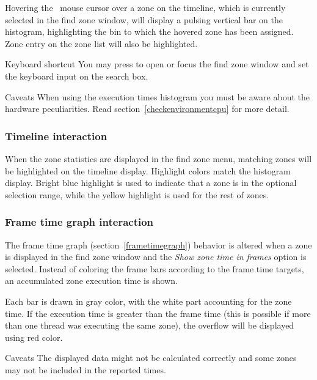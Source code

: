 \documentclass[hidelinks,titlepage,a4paper]{article}
\begin{document}
Hovering the \faMousePointer{}~mouse cursor over a zone on the timeline, which is currently selected in the find zone window, will display a pulsing vertical bar on the histogram, highlighting the bin to which the hovered zone has been assigned. Zone entry on the zone list will also be highlighted.

\begin{bclogo}[
noborder=true,
couleur=black!5,
logo=\bclampe
]{Keyboard shortcut}
You may press  to open or focus the find zone window and set the keyboard input on the search box.
\end{bclogo}

\begin{bclogo}[
noborder=true,
couleur=black!5,
logo=\bcattention
]{Caveats}
When using the execution times histogram you must be aware about the hardware peculiarities. Read section~\ref{checkenvironmentcpu} for more detail.
\end{bclogo}

\subsubsection{Timeline interaction}

When the zone statistics are displayed in the find zone menu, matching zones will be highlighted on the timeline display. Highlight colors match the histogram display. Bright blue highlight is used to indicate that a zone is in the optional selection range, while the yellow highlight is used for the rest of zones.

\subsubsection{Frame time graph interaction}
\label{frametimefindzone}

The frame time graph (section~\ref{frametimegraph}) behavior is altered when a zone is displayed in the find zone window and the \emph{Show zone time in frames} option is selected. Instead of coloring the frame bars according to the frame time targets, an accumulated zone execution time is shown.

Each bar is drawn in gray color, with the white part accounting for the zone time. If the execution time is greater than the frame time (this is possible if more than one thread was executing the same zone), the overflow will be displayed using red color.

\begin{bclogo}[
noborder=true,
couleur=black!5,
logo=\bcattention
]{Caveats}
The displayed data might not be calculated correctly and some zones may not be included in the reported times.
\end{bclogo}
\end{document}
